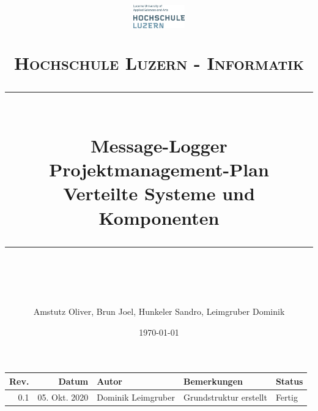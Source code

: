 \documentclass[11pt]{scrartcl} %
\title{	
	\begin{figure}[h]
		\begin{flushright}
			\includegraphics[width=0.2\textwidth]{Bilder/hsluLogo.eps}			
		\end{flushright}
	\end{figure}
	\vspace{10pt} %
	\normalfont\normalsize
	\textsc{Hochschule Luzern - Informatik}
	\vspace{12pt} %
	\rule{\linewidth}{0.5pt}\\ %
	{\huge Message-Logger}\\
	{\huge Projektmanagement-Plan}\\ %
	\vspace{10pt} %
	{\large Verteilte Systeme und Komponenten }
	\vspace{12pt} %
	\rule{\linewidth}{2pt}\\ %
	\vspace{12pt} %
}
\author{\Large Amstutz Oliver, Brun Joel, Hunkeler Sandro, Leimgruber Dominik} %
\date{\normalsize\today} %
\begin{document}
\maketitle %
\pagestyle{fancy}
\thispagestyle{empty}
\setcounter{page}{0}
\newpage
\begin{center}
	\begin{tabularx}{\textwidth}{|r|r|l|X|l|}
		\hline
		\textbf{Rev.} & \textbf{Datum} & \textbf{Autor} & \textbf{Bemerkungen} & \textbf{Status}  \\ 
		\hline
		0.1 & 05. Okt. 2020 & Dominik Leimgruber & Grundstruktur erstellt & Fertig \\
		\hline
	\end{tabularx}
\end{center}
\listoffigures
\listoftables
\newpage
\tableofcontents

\newpage








%


\end{document}
